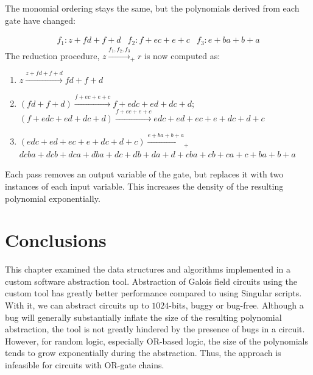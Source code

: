 \begin{Example}
{%
The monomial ordering stays the same, but the polynomials derived from each gate
have changed:

\begin{eqnarray}
f_1:z+fd+f+d & f_2:f+ec+e+c & f_3:e+ba+b+a \nonumber
\end{eqnarray}
The reduction procedure, $z \xrightarrow{f_1,f_2,f_3}_+ r$ is now computed as:
\begin{enumerate}
\item $z \xrightarrow{z+fd+f+d}fd+f+d$
\item $(fd+f+d)\xrightarrow{f+ec+e+c}f+edc+ed+dc+d$;\\
$(f+edc+ed+dc+d)\xrightarrow{f+ec+e+c}edc+ed+ec+e+dc+d+c$
\item $(edc+ed+ec+e+dc+d+c)\xrightarrow{e+ba+b+a}_+$\\ $dcba+dcb+dca+dba+dc+db+da+d+cba+cb+ca+c+ba+b+a$
\end{enumerate}
Each pass removes an output variable of the gate, but replaces it with two instances of each input variable.
This increases the density of the resulting polynomial exponentially.
}
\end{Example}

\section{Conclusions}

This chapter examined the data structures and algorithms implemented in a
custom software abstraction tool.
Abstraction of Galois field circuits using the custom tool has 
greatly better performance compared to using {\sc Singular} scripts. With it, we can
abstract circuits up to $1024$-bits, buggy or bug-free. Although a bug will 
generally substantially inflate the size of the resulting polynomial abstraction, 
the tool is not greatly hindered by the presence of bugs in a circuit.
However, for random logic, especially OR-based logic, the size of the polynomials tends 
to grow exponentially during the abstraction. Thus, the approach is infeasible for
circuits with OR-gate chains.
